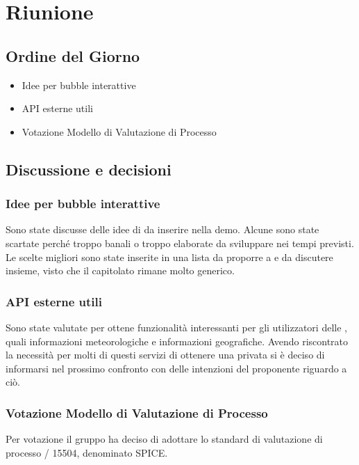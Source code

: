\section{Riunione}
\subsection{Ordine del Giorno}
\begin{itemize}
	\item Idee per bubble interattive
	\item API esterne utili
	\item Votazione Modello di Valutazione di Processo
\end{itemize}

\subsection{Discussione e decisioni}
\subsubsection{Idee per bubble interattive}
Sono state discusse delle idee di  da inserire nella demo. Alcune sono state scartate perché troppo banali o troppo elaborate da sviluppare nei tempi previsti. Le scelte migliori sono state inserite in una lista da proporre a \Proponente{} e da discutere insieme, visto che il capitolato rimane molto generico.

\subsubsection{API esterne utili}
Sono state valutate  per ottene funzionalità interessanti per gli utilizzatori delle , quali informazioni meteorologiche e informazioni geografiche. Avendo riscontrato la necessità per molti di questi servizi di ottenere una  privata si è deciso di informarsi nel prossimo confronto con \Proponente{} delle intenzioni del proponente riguardo a ciò.  

\subsubsection{Votazione Modello di Valutazione di Processo}
Per votazione il gruppo \GroupName{} ha deciso di adottare lo standard di valutazione di processo / 15504, denominato SPICE.

\clearpage
